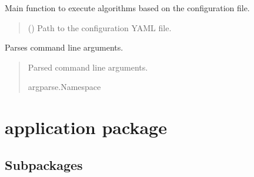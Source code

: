 \documentclass[letterpaper,10pt,english]{sphinxmanual}
\begin{document}
\begin{fulllineitems}
\label{\detokenize{algorithmRun:algorithmRun.main}}
\pysigstartsignatures
{}
\pysigstopsignatures
\sphinxAtStartPar
Main function to execute algorithms based on the configuration file.
\begin{quote}\begin{description}
\sphinxAtStartPar
{} () \textendash{} Path to the configuration YAML file.

\end{description}\end{quote}

\end{fulllineitems}


\begin{fulllineitems}
\label{\detokenize{algorithmRun:algorithmRun.parse_arguments}}
\pysigstartsignatures
{}
\pysigstopsignatures
\sphinxAtStartPar
Parses command line arguments.
\begin{quote}\begin{description}
\sphinxAtStartPar
Parsed command line arguments.

\sphinxAtStartPar
argparse.Namespace

\end{description}\end{quote}

\end{fulllineitems}


\sphinxstepscope


\section{application package}
\label{\detokenize{application:application-package}}\label{\detokenize{application::doc}}

\subsection{Subpackages}
\label{\detokenize{application:subpackages}}
\sphinxstepscope
\end{document}
